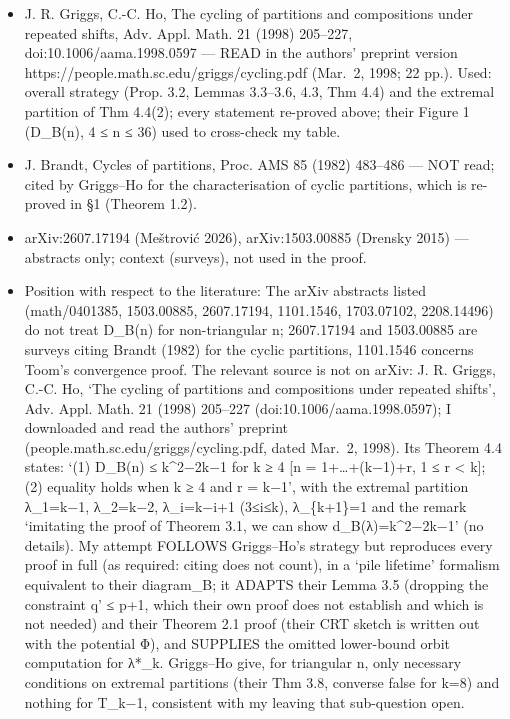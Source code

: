 \begin{itemize}
\tightlist
\item
  J. R. Griggs, C.-C. Ho, The cycling of partitions and compositions
  under repeated shifts, Adv. Appl. Math. 21 (1998) 205--227,
  doi:10.1006/aama.1998.0597 --- READ in the authors' preprint version
  https://people.math.sc.edu/griggs/cycling.pdf (Mar.~2, 1998; 22 pp.).
  Used: overall strategy (Prop. 3.2, Lemmas 3.3--3.6, 4.3, Thm 4.4) and
  the extremal partition of Thm 4.4(2); every statement re-proved above;
  their Figure 1 (D\_B(n), 4 ≤ n ≤ 36) used to cross-check my table.
\item
  J. Brandt, Cycles of partitions, Proc. AMS 85 (1982) 483--486 --- NOT
  read; cited by Griggs--Ho for the characterisation of cyclic
  partitions, which is re-proved in §1 (Theorem 1.2).
\item
  arXiv:2607.17194 (Meštrović 2026), arXiv:1503.00885 (Drensky 2015) ---
  abstracts only; context (surveys), not used in the proof.
\item
  Position with respect to the literature: The arXiv abstracts listed
  (math/0401385, 1503.00885, 2607.17194, 1101.1546, 1703.07102,
  2208.14496) do not treat D\_B(n) for non-triangular n; 2607.17194 and
  1503.00885 are surveys citing Brandt (1982) for the cyclic partitions,
  1101.1546 concerns Toom's convergence proof. The relevant source is
  not on arXiv: J. R. Griggs, C.-C. Ho, `The cycling of partitions and
  compositions under repeated shifts', Adv. Appl. Math. 21 (1998)
  205--227 (doi:10.1006/aama.1998.0597); I downloaded and read the
  authors' preprint (people.math.sc.edu/griggs/cycling.pdf, dated
  Mar.~2, 1998). Its Theorem 4.4 states: `(1) D\_B(n) ≤ k\^{}2−2k−1 for
  k ≥ 4 {[}n = 1+\ldots+(k−1)+r, 1 ≤ r \textless{} k{]}; (2) equality
  holds when k ≥ 4 and r = k−1', with the extremal partition λ\_1=k−1,
  λ\_2=k−2, λ\_i=k−i+1 (3≤i≤k), λ\_\{k+1\}=1 and the remark `imitating
  the proof of Theorem 3.1, we can show d\_B(λ)=k\^{}2−2k−1' (no
  details). My attempt FOLLOWS Griggs--Ho's strategy but reproduces
  every proof in full (as required: citing does not count), in a `pile
  lifetime' formalism equivalent to their diagram\_B; it ADAPTS their
  Lemma 3.5 (dropping the constraint q' ≤ p+1, which their own proof
  does not establish and which is not needed) and their Theorem 2.1
  proof (their CRT sketch is written out with the potential Φ), and
  SUPPLIES the omitted lower-bound orbit computation for λ*\_k.
  Griggs--Ho give, for triangular n, only necessary conditions on
  extremal partitions (their Thm 3.8, converse false for k=8) and
  nothing for T\_k−1, consistent with my leaving that sub-question open.
\end{itemize}


